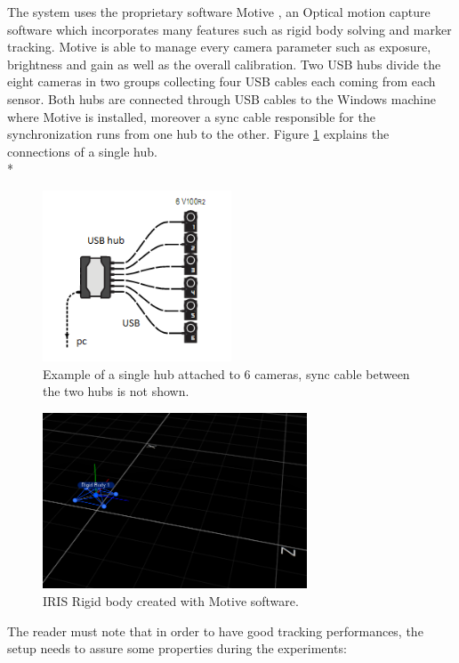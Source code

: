 The system uses the proprietary software Motive \cite{OptiT}, an Optical motion capture software which incorporates many features such as rigid body solving and marker tracking. Motive is able to manage every camera parameter such as exposure, brightness and gain as well as the overall calibration.
Two USB hubs divide the eight cameras in two groups collecting four USB cables each coming from each sensor. Both hubs are connected through USB cables to the Windows machine where Motive is installed, moreover a sync cable responsible for the synchronization runs from one hub to the other.
Figure \ref{figure:hub} explains the connections of a single hub.
\\*

\begin{figure}[H]
\centering
 \includegraphics[width=0.5\textwidth]{HUB.png}
 \caption[Single hub connection]{Example of a single hub attached to 6 cameras, sync cable between the two hubs is not shown.}
 \label{figure:hub}
\end{figure}

\begin{figure}[h]
\centering
 \includegraphics[width=0.7\textwidth]{motiv_iris.PNG}
 \caption[IRIS Rigid body]{IRIS Rigid body created with Motive software.}
 \label{figure:motivescreen}
\end{figure}
\noindent
The reader must note that in order to have good tracking performances, the setup needs to assure some properties during the experiments:

